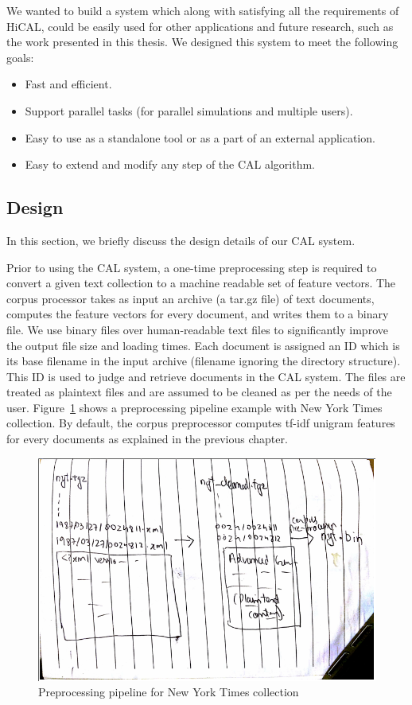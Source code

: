 We wanted to build a system which along with satisfying all the requirements of
HiCAL, could be easily used for other applications and future research, such as
the work presented in this thesis. We designed this system to meet the following
goals:

\begin{itemize}
\item Fast and efficient.
\item Support parallel tasks (for parallel simulations and multiple users).
\item Easy to use as a standalone tool or as a part of an external application.
\item Easy to extend and modify any step of the CAL algorithm.
\end{itemize}

\subsection{Design}
In this section, we briefly discuss the design details of our CAL system.

Prior to using the CAL system, a one-time preprocessing step is required to convert a
given text collection to a machine readable set of feature vectors. The corpus
processor takes as input an archive (a tar.gz file) of text documents, computes
the feature vectors for every document, and writes them to a binary file. We use
binary files over human-readable text files to significantly improve the output
file size and loading times. 
Each document is assigned an ID which is its base filename in the input archive
(filename ignoring the directory structure). This ID is used to judge and
retrieve documents in the CAL system. The files are treated as plaintext files
and are assumed to be cleaned as per the needs of the user.
Figure~\ref{fig:preprocessing} shows a preprocessing pipeline example with New
York Times collection.  By default, the corpus preprocessor computes tf-idf
unigram features for every documents as explained in the previous chapter.

\begin{figure}[h]
\includegraphics[width=\textwidth]{tmp_pictures/preprocessing_pipeline.png}
\caption{Preprocessing pipeline for New York Times collection}
\label{fig:preprocessing}
\end{figure}

